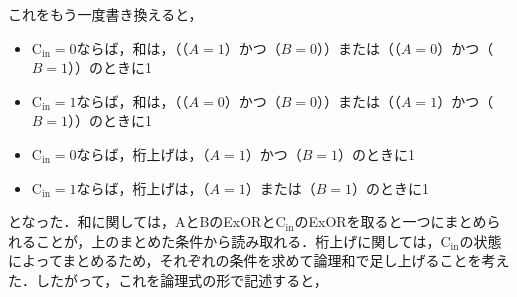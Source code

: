 これをもう一度書き換えると，

\begin{itemize}
	\item $\mathrm{C_{in}}=0$ならば，和は，（（$A=1$）かつ（$B=0$））または（（$A=0$）かつ（$B=1$））のときに1
	\item $\mathrm{C_{in}}=1$ならば，和は，（（$A=0$）かつ（$B=0$））または（（$A=1$）かつ（$B=1$））のときに1
	\item $\mathrm{C_{in}}=0$ならば，桁上げは，（$A=1$）かつ（$B=1$）のときに1
	\item $\mathrm{C_{in}}=1$ならば，桁上げは，（$A=1$）または（$B=1$）のときに1
\end{itemize}

となった．和に関しては，AとBのExORと$\mathrm{C_{in}}$のExORを取ると一つにまとめられることが，上のまとめた条件から読み取れる．桁上げに関しては，$\mathrm{C_{in}}$の状態によってまとめるため，それぞれの条件を求めて論理和で足し上げることを考えた．したがって，これを論理式の形で記述すると，


